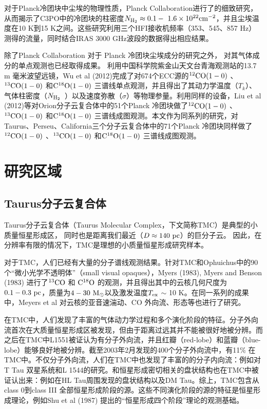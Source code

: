 \documentclass[UTF8, nocolorlinks]{pkuthss}
\newcommand{\cob}{$\rm ^{13}CO$ }
\newcommand{\coc}{$\rm C^{18}O$ }
\newcommand{\coaa}{$\rm^{12}CO(1-0)$ }
\newcommand{\cobb}{$\rm^{13}CO(1-0)$ }
\newcommand{\cocc}{$\rm C^{18}O(1-0)$ }
\newcommand{\texc}{$T_{\rm {ex}}$ }
\newcommand{\nhyd}{$N_{\rm H_2}$\ }
\begin{document}
		对于Planck冷团块中尘埃的物理性质，Planck Collaboration进行了的细致研究，从而揭示了C3PO中的冷团块的柱密度$N_ {\rm H_2} \approx 0.1 \rm - \ 1.6 \times 10^{22} \rm cm^{-2}$，并且尘埃温度在10 K到15 K之间\supercite{2011A&A...536A..23P}。这些研究利用三个HFI接收机频率（353、545、857 Hz）测得的流量，同时结合IRAS 3000 GHz波段的数据得出相应结果\supercite{2011A&A...536A..23P,2011A&A...536A..22P}。

		除了Planck Collaboration 对于 Planck 冷团块尘埃成分的研究之外， 对其气体成分的单点观测也已经取得成果。 利用中国科学院紫金山天文台青海观测站的13.7 m 毫米波望远镜，Wu et al (2012)完成了对674个ECC源的\coaa 、\cobb  和\cocc  三谱线单点观测，并且得出了其动力学温度（$T_k$）、气体柱密度（\nhyd）以及速度弥散（$\sigma$）等物理参量\supercite{wu2012gas}。利用同样的设备，Liu et al (2012)等对Orion分子云复合体中的51个Planck 冷团块做了\coaa 、\cobb  和\cocc  三谱线成图观测\supercite{LiuTie}。本文作为同系列的研究，对Taurus、Perseu、California三个分子云复合体中的71个Planck 冷团块同样做了\coaa 、\cobb  和\cocc  三谱线成图观测。

	\section{研究区域}

		\subsection{Taurus分子云复合体}

			Taurus分子云复合体（Taurus Molecular Complex，下文简称TMC）是典型的小质量恒星形成区， 同时也是距离我们最近（$D\approx 140\rm\ pc$）的巨分子云\supercite{1987ApJ...322..706D}。 因此，在分辨率有限的情况下，TMC是理想的小质量恒星形成研究样本。

			对于TMC，人们已经有大量的分子谱线观测结果。针对TMC和Ophuichus中的90个“微小光学不透明体”（small visual opaques），Myers (1983), Myers and Benson (1983) 进行了\cob 和 \coc 的观测，并且得出其中的云核几何尺度为$0.1-0.3 \ \rm pc$，质量为$4-30\ \rm M_\odot$以及激发温度\texc $\sim$ 10 K\supercite{1983ApJ...264..517M,1983ApJ...266..309M}。在同一系列的成果中，Meyers et al 对云核的亚音速湍动、CO 外向流、形态等也进行了研究\supercite{1983ApJ...270..105M,1988ApJ...324..907M,1991ApJ...376..561M}。

			在TMC中，人们发现了丰富的气体动力学过程和多个演化阶段的特征。分子外向流首次在大质量恒星形成区被发现，但由于距离过远其并不能被很好地被分辨\supercite{1976ApJ...209L.137Z}。而之后在TMC中L1551被证认为有分子外向流，并且红瓣（red-lobe）和蓝瓣（blue-lobe）能够良好地被分辨\supercite{1980ApJ...239L..17S}。截至2003年2月发现的400个分子外向流中，有11\% 在TMC中\supercite{2004A&A...426..503W}。不仅分子外向流，人们在TMC中也发现了丰富的的分子内向流：例如对T Tau 双星系统\supercite{1994ApJ...425L..45V}和L 1544的研究\supercite{1998ApJ...504..900T}。和恒星形成密切相关的盘状结构也在TMC中被证认出来：例如在HL Tau周围发现的盘状结构\supercite{1991ApJ...382L..31S}以及DM Tau\supercite{1995ApJ...453..384S}。综上，TMC包含从class 0到class III 全部恒星形成阶段的源。这些不同演化阶段的源的特征是恒星形成理论，例如Shu et al (1987) 提出的“恒星形成四个阶段”理论\supercite{shu1987star}的观测基础。
\end{document}
